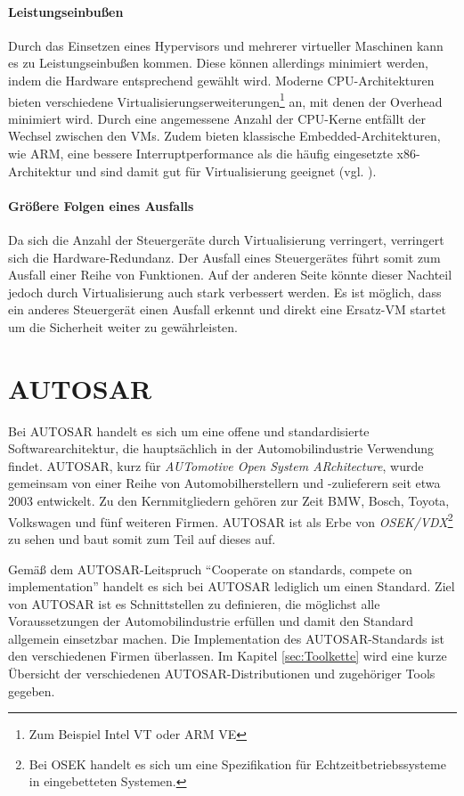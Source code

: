 \documentclass[
  a4paper,					    %
  twoside,
  DIV=calc,     				%
  bibliography=totoc,
  cleardoublepage=empty,
  ngerman,     					%
  final       					%
]{scrbook}
\begin{document}
\paragraph{Leistungseinbußen}
Durch das Einsetzen eines Hypervisors und mehrerer virtueller Maschinen kann es zu Leistungseinbußen kommen. Diese können allerdings minimiert werden, indem die Hardware entsprechend gewählt wird. Moderne CPU-Architekturen bieten verschiedene Virtualisierungserweiterungen\footnote{Zum Beispiel Intel VT oder ARM VE} an, mit denen der Overhead minimiert wird. Durch eine angemessene Anzahl der CPU-Kerne entfällt der Wechsel zwischen den VMs. Zudem bieten klassische Embedded-Architekturen, wie ARM, eine bessere Interruptperformance als die häufig eingesetzte x86-Architektur und sind damit gut für Virtualisierung geeignet (vgl. \cite{okl4}).

\paragraph{Größere Folgen eines Ausfalls}
Da sich die Anzahl der Steuergeräte durch Virtualisierung verringert, verringert sich die Hardware-Redundanz. Der Ausfall eines Steuergerätes führt somit zum Ausfall einer Reihe von Funktionen. Auf der anderen Seite könnte dieser Nachteil jedoch durch Virtualisierung auch stark verbessert werden. Es ist möglich, dass ein anderes Steuergerät einen Ausfall erkennt und direkt eine Ersatz-VM startet um die Sicherheit weiter zu gewährleisten. 


\section{AUTOSAR}
\label{sec:Autosar}
Bei AUTOSAR handelt es sich um eine offene und standardisierte Softwarearchitektur, die hauptsächlich in der Automobilindustrie Verwendung findet. AUTOSAR, kurz für \emph{AUTomotive Open System ARchitecture}, wurde gemeinsam von einer Reihe von Automobilherstellern und -zulieferern seit etwa 2003 entwickelt. Zu den Kernmitgliedern gehören zur Zeit BMW, Bosch, Toyota, Volkswagen und fünf weiteren Firmen. AUTOSAR ist als Erbe von \emph{OSEK/VDX}\footnote{Bei OSEK handelt es sich um eine Spezifikation für Echtzeitbetriebssysteme in eingebetteten Systemen.} zu sehen und baut somit zum Teil auf dieses auf.

Gemäß dem AUTOSAR-Leitspruch "`Cooperate on standards, compete on implementation"' handelt es sich bei AUTOSAR lediglich um einen Standard. Ziel von AUTOSAR ist es Schnittstellen zu definieren, die möglichst alle Voraussetzungen der Automobilindustrie erfüllen und damit den Standard allgemein einsetzbar machen. Die Implementation des AUTOSAR-Standards ist den verschiedenen Firmen überlassen. Im Kapitel \ref{sec:Toolkette} wird eine kurze Übersicht der verschiedenen AUTOSAR-Distributionen und zugehöriger Tools gegeben.
\end{document}

